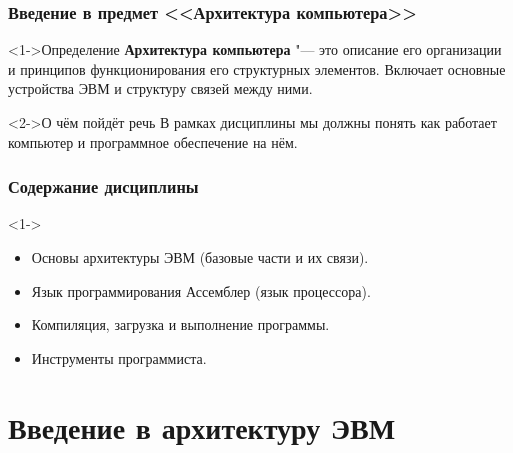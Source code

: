 \documentclass[pdf,9pt,aspectratio=169]{beamer}
\begin{document}
\begin{frame}\frametitle{Введение в предмет <<Архитектура компьютера>>}
  \begin{block}<1->{Определение}
    \textbf{Архитектура компьютера} "---  это описание его организации и принципов функционирования его структурных элементов. Включает основные устройства ЭВМ и структуру связей между ними.
  \end{block}
  \begin{block}<2->{О чём пойдёт речь}
    В рамках дисциплины мы должны понять как работает компьютер и программное обеспечение на нём.
  \end{block}
\end{frame}

\begin{frame}\frametitle{Содержание дисциплины}
  \begin{block}<1->{}
    \begin{itemize}
      \item Основы архитектуры ЭВМ (базовые части и их связи).
      \item Язык программирования Ассемблер (язык процессора).
      \item Компиляция, загрузка и выполнение программы.
      \item Инструменты программиста.
    \end{itemize}
  \end{block}
\end{frame}

\section{Введение в архитектуру ЭВМ}
\end{document}
